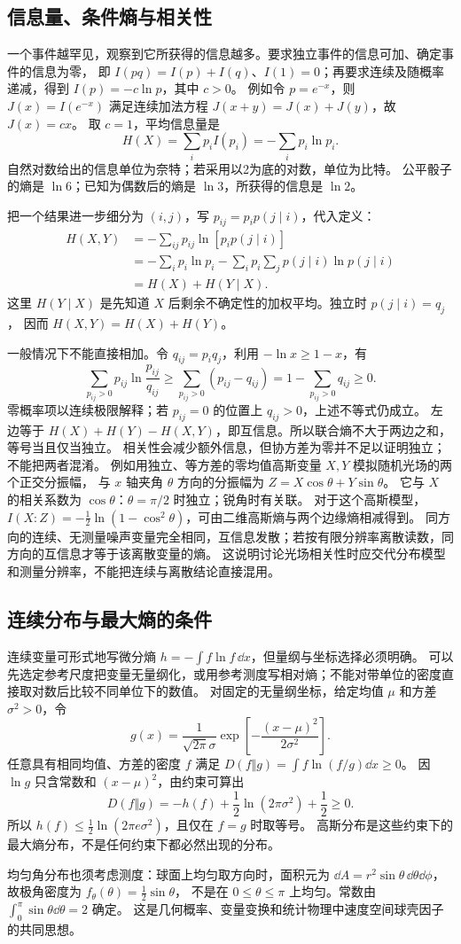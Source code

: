 \subsection{信息量、条件熵与相关性}

一个事件越罕见，观察到它所获得的信息越多。要求独立事件的信息可加、确定事件的信息为零，
即 $I(pq)=I(p)+I(q)$、$I(1)=0$；再要求连续及随概率递减，得到 $I(p)=-c\ln p$，其中 $c>0$。
例如令 $p=e^{-x}$，则 $J(x)=I(e^{-x})$ 满足连续加法方程 $J(x+y)=J(x)+J(y)$，故 $J(x)=cx$。
取 $c=1$，平均信息量是
\[H(X)=\sum_i p_i I(p_i)=-\sum_i p_i\ln p_i.\]
自然对数给出的信息单位为奈特；若采用以2为底的对数，单位为比特。
公平骰子的熵是 $\ln6$；已知为偶数后的熵是 $\ln3$，所获得的信息是 $\ln2$。

把一个结果进一步细分为 $(i,j)$，写 $p_{ij}=p_i p(j\mid i)$，代入定义：
\begin{align*}
 H(X,Y)&=-\sum_{ij}p_{ij}\ln[p_i p(j\mid i)]\\
 &= -\sum_i p_i\ln p_i
    -\sum_i p_i\sum_jp(j\mid i)\ln p(j\mid i)\\
 &=H(X)+H(Y\mid X).
\end{align*}
这里 $H(Y\mid X)$ 是先知道 $X$ 后剩余不确定性的加权平均。独立时 $p(j\mid i)=q_j$，
因而 $H(X,Y)=H(X)+H(Y)$。

一般情况下不能直接相加。令 $q_{ij}=p_iq_j$，利用 $-\ln x\ge1-x$，有
\[\sum_{p_{ij}>0}p_{ij}\ln\frac{p_{ij}}{q_{ij}}
\ge\sum_{p_{ij}>0}(p_{ij}-q_{ij})
=1-\sum_{p_{ij}>0}q_{ij}\ge0.\]
零概率项以连续极限解释；若 $p_{ij}=0$ 的位置上 $q_{ij}>0$，上述不等式仍成立。
左边等于 $H(X)+H(Y)-H(X,Y)$，即互信息。所以联合熵不大于两边之和，等号当且仅当独立。
相关性会减少额外信息，但协方差为零并不足以证明独立；不能把两者混淆。
例如用独立、等方差的零均值高斯变量 $X,Y$ 模拟随机光场的两个正交分振幅，
与 $x$ 轴夹角 $\theta$ 方向的分振幅为 $Z=X\cos\theta+Y\sin\theta$。
它与 $X$ 的相关系数为 $\cos\theta$：$\theta=\pi/2$ 时独立；锐角时有关联。
对于这个高斯模型，$I(X{:}Z)=-\tfrac12\ln(1-\cos^2\theta)$，可由二维高斯熵与两个边缘熵相减得到。
同方向的连续、无测量噪声变量完全相同，互信息发散；若按有限分辨率离散读数，同方向的互信息才等于该离散变量的熵。
这说明讨论光场相关性时应交代分布模型和测量分辨率，不能把连续与离散结论直接混用。

\subsection{连续分布与最大熵的条件}

连续变量可形式地写微分熵 $h=-\int f\ln f\,\dd x$，但量纲与坐标选择必须明确。
可以先选定参考尺度把变量无量纲化，或用参考测度写相对熵；不能对带单位的密度直接取对数后比较不同单位下的数值。
对固定的无量纲坐标，给定均值 $\mu$ 和方差 $\sigma^2>0$，令
\[g(x)=\frac1{\sqrt{2\pi}\sigma}\exp\!\left[-\frac{(x-\mu)^2}{2\sigma^2}\right].\]
任意具有相同均值、方差的密度 $f$ 满足 $D(f\Vert g)=\int f\ln(f/g)\dd x\ge0$。
因 $\ln g$ 只含常数和 $(x-\mu)^2$，由约束可算出
\[D(f\Vert g)=-h(f)+\frac12\ln(2\pi\sigma^2)+\frac12\ge0.\]
所以 $h(f)\le\tfrac12\ln(2\pi e\sigma^2)$，且仅在 $f=g$ 时取等号。
高斯分布是这些约束下的最大熵分布，不是任何约束下都必然出现的分布。

均匀角分布也须考虑测度：球面上均匀取方向时，面积元为
$\dd A=r^2\sin\theta\,\dd\theta\dd\phi$，故极角密度为 $f_\theta(\theta)=\tfrac12\sin\theta$，
不是在 $0\le\theta\le\pi$ 上均匀。常数由 $\int_0^\pi\sin\theta\dd\theta=2$ 确定。
这是几何概率、变量变换和统计物理中速度空间球壳因子的共同思想。
